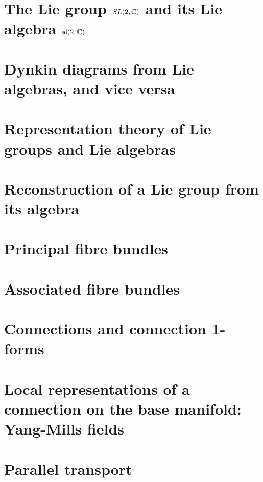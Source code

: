 \documentclass[
11pt, %
a4paper, %
twoside, %
headinclude,footinclude, %
]{scrartcl}
\begin{document}
\section{The Lie group $SL(2,\mathbb{C})$ and its Lie algebra $\mathfrak{sl}(2,\mathbb{C})$}



\section{Dynkin diagrams from Lie algebras, and vice versa}



\section{Representation theory of Lie groups and Lie algebras}



\section{Reconstruction of a Lie group from its algebra}



\section{Principal fibre bundles}



\section{Associated fibre bundles}



\section{Connections and connection 1-forms}



\section{Local representations of a connection on the base manifold: Yang-Mills fields}



\section{Parallel transport}
\end{document}
